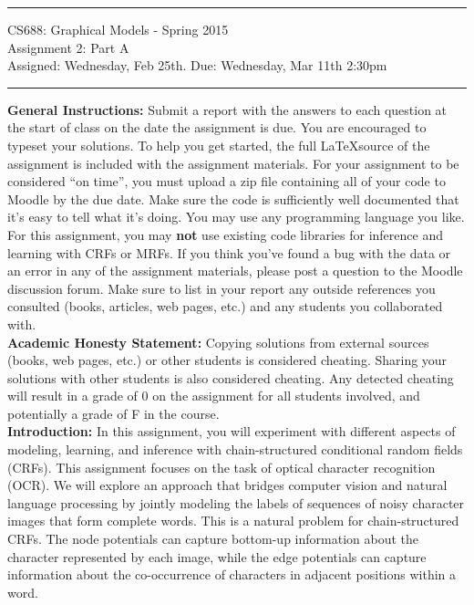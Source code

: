 \documentclass[11pt]{article}
\begin{document}
{\centering
  \rule{6.3in}{2pt}
  \vspace{1em}
  {\Large
    CS688: Graphical Models - Spring 2015\\
    Assignment 2: Part A\\
  }
  \vspace{1em}
  Assigned: Wednesday, Feb 25th. Due: Wednesday, Mar 11th 2:30pm\\
  \vspace{0.1em}
  \rule{6.3in}{1.5pt}
}\vspace{1em}

\textbf{General Instructions:} Submit a report with the answers to each question at the start of class on the date the assignment is due. You are encouraged to typeset your solutions. To help you get started, the full \LaTeX source of the assignment is included with the assignment materials. For your assignment to be considered ``on time'', you must upload a zip file containing all of your code to Moodle by the due date. Make sure the code is sufficiently well documented that it's easy to tell what it's doing. You may use any programming language you like. For this assignment, you may \textbf{not} use existing code libraries for inference and learning with CRFs or MRFs. If you think you've found a bug with the data or an error in any of the assignment materials, please post a question to the Moodle discussion forum. Make sure to list in your report any outside references you consulted (books, articles, web pages, etc.) and any students you collaborated with.\\

\textbf{Academic Honesty Statement:} Copying solutions from external sources (books, web pages, etc.) or other students is considered cheating. Sharing your solutions with other students is also considered cheating. Any detected cheating will result in a grade of 0 on the assignment for all students involved, and potentially a grade of F in the course.\\

\textbf{Introduction:} In this assignment, you will experiment with different aspects of modeling, learning, and inference with chain-structured conditional random fields (CRFs). This assignment focuses on the task of 
optical character recognition (OCR). We will explore an approach that bridges computer vision and natural language processing by jointly modeling the labels of sequences of noisy character images that form complete words. This is a natural problem for chain-structured CRFs. The node potentials can capture bottom-up information about the character represented by each image, while the edge potentials can capture information about the co-occurrence of characters in adjacent positions within a word. 
\\
\end{document}
